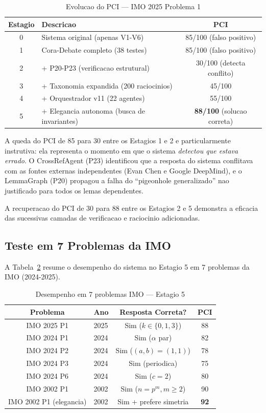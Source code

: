 \documentclass[5p]{elsarticle}
\begin{document}
\begin{table}[H]
  \centering
  \caption{Evolucao do PCI — IMO 2025 Problema 1}
  \label{tab:pci}
  \begin{tabular}{clc}
    \toprule
    \textbf{Estagio} & \textbf{Descricao} & \textbf{PCI} \\
    \midrule
    0 & Sistema original (apenas V1-V6) & 85/100 (falso positivo) \\
    1 & Cora-Debate completo (38 testes) & 85/100 (falso positivo) \\
    2 & + P20-P23 (verificacao estrutural) & 30/100 (detecta conflito) \\
    3 & + Taxonomia expandida (200 raciocinios) & 45/100 \\
    4 & + Orquestrador v11 (22 agentes) & 55/100 \\
    5 & + Elegancia autonoma (busca de invariantes) & \textbf{88/100} (solucao correta) \\
    \bottomrule
  \end{tabular}
\end{table}

A queda do PCI de 85 para 30 entre os Estagios 1 e 2 e particularmente
instrutiva: ela representa o momento em que o sistema \textit{detectou que
estava errado}. O CrossRefAgent (P23) identificou que a resposta do sistema
conflitava com as fontes externas independentes (Evan Chen e Google DeepMind),
e o LemmaGraph (P20) propagou a falha do ``pigeonhole generalizado'' nao
justificado para todos os lemas dependentes.

A recuperacao do PCI de 30 para 88 entre os Estagios 2 e 5 demonstra a
eficacia das sucessivas camadas de verificacao e raciocinio adicionadas.

\subsection{Teste em 7 Problemas da IMO}

A Tabela~\ref{tab:imo} resume o desempenho do sistema no Estagio 5 em
7 problemas da IMO (2024-2025).

\begin{table}[H]
  \centering
  \caption{Desempenho em 7 problemas IMO — Estagio 5}
  \label{tab:imo}
  \begin{tabular}{clcc}
    \toprule
    \textbf{Problema} & \textbf{Ano} & \textbf{Resposta Correta?} & \textbf{PCI} \\
    \midrule
    IMO 2025 P1 & 2025 & Sim ($k\in\{0,1,3\}$) & 88 \\
    IMO 2024 P1 & 2024 & Sim ($\alpha$ par) & 82 \\
    IMO 2024 P2 & 2024 & Sim ($(a,b)=(1,1)$) & 78 \\
    IMO 2024 P3 & 2024 & Sim (periodica) & 75 \\
    IMO 2024 P6 & 2024 & Sim ($c=2$) & 80 \\
    IMO 2002 P1 & 2002 & Sim ($n=p^m, m\geq 2$) & 90 \\
    IMO 2002 P1 (elegancia) & 2002 & Sim + prefere simetria & \textbf{92} \\
    \bottomrule
  \end{tabular}
\end{table}
\end{document}
